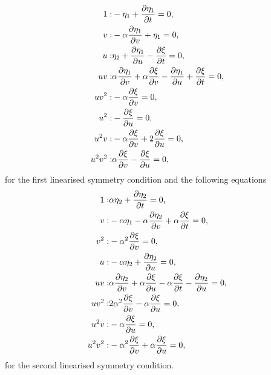 \begin{align}
1:&- \eta_1 +\pdv{\eta_1}{t}=0,\\
v:&- \alpha \pdv{\eta_1}{v}  + \eta_1=0,\\
u:&\eta_2 + \pdv{\eta_1}{u}  - \pdv{\xi}{t}=0,\\
u v:&\alpha \pdv{\eta_1}{v}  + \alpha \pdv{\xi}{v}  - \pdv{\eta_1}{u}  + \pdv{\xi}{t}=0,\\
u v^{2}:&- \alpha \pdv{\xi}{v} =0,\\
u^{2}:&- \pdv{\xi}{u} =0,\\
u^{2} v:&- \alpha \pdv{\xi}{v}  + 2 \pdv{\xi}{u} =0,\\
u^{2} v^{2}:&\alpha \pdv{\xi}{v} - \pdv{\xi}{u}=0,
\end{align}
for the first linearised symmetry condition and the following equations
\begin{align}
1:&\alpha \eta_2 + \pdv{\eta_2}{t}=0,\\
v:&- \alpha \eta_1 - \alpha \pdv{\eta_2}{v}  + \alpha \pdv{\xi}{t}=0,\\
v^{2}:&- \alpha^{2} \pdv{\xi}{v} =0,\\
u:&- \alpha \eta_2 + \pdv{\eta_2}{u} =0,\\
u v:&\alpha \pdv{\eta_2}{v}  + \alpha \pdv{\xi}{u}  - \alpha \pdv{\xi}{t} - \pdv{\eta_2}{u} =0,\\
u v^{2}:&2 \alpha^{2} \pdv{\xi}{v}  - \alpha \pdv{\xi}{u} =0,\\
u^{2} v:&- \alpha \pdv{\xi}{u} =0,\\
u^{2} v^{2}:&- \alpha^{2} \pdv{\xi}{v}  + \alpha \pdv{\xi}{u} =0,
\end{align}
for the second linearised symmetry condition. 